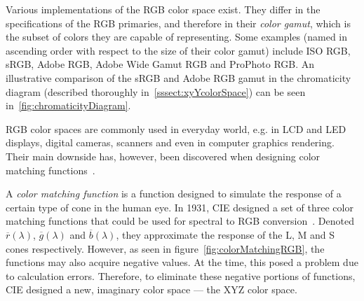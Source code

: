 Various implementations of the RGB color space exist. They differ in the specifications of the RGB primaries, and therefore in their \emph{color gamut}, which is the subset of colors they are capable of representing. Some examples (named in ascending order with respect to the size of their color gamut) include ISO RGB, sRGB, Adobe RGB, Adobe Wide Gamut RGB and ProPhoto RGB. An illustrative comparison of the sRGB and Adobe RGB gamut in the chromaticity diagram (described thoroughly in~\cref{sssect:xyYcolorSpace}) can be seen in~\cref{fig:chromaticityDiagram}.

RGB color spaces are commonly used in everyday world, e.g. in LCD and LED displays, digital cameras, scanners and even in computer graphics rendering. Their main downside has, however, been discovered when designing color matching functions~\cite{colorMatchingDerivation}.

A \emph{color matching function} is a function designed to simulate the response of a certain type of cone in the human eye. In 1931, CIE designed a set of three color matching functions that could be used for spectral to RGB conversion~\cite{colorMatchingDerivation}. Denoted $\overline{r}(\lambda)$, $\overline{g}(\lambda)$ and $\overline{b}(\lambda)$, they approximate the response of the L, M and S cones respectively. However, as seen in figure~\cref{fig:colorMatchingRGB}, the functions may also acquire negative values. At the time, this posed a problem due to calculation errors. Therefore, to eliminate these negative portions of functions, CIE designed a new, imaginary color space --- the XYZ color space.


